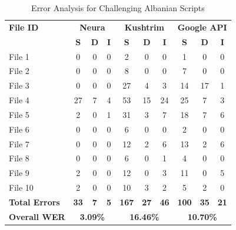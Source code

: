 \documentclass[12pt]{article}
\begin{document}
\begin{table}[h!]
\centering
\caption{Error Analysis for Challenging Albanian Scripts}
\label{tab:firs_test}
\begin{tabular}{lccc|ccc|ccc}
\toprule
\textbf{File ID} & \multicolumn{3}{c}{\textbf{Neura}} & \multicolumn{3}{c}{\textbf{Kushtrim}} & \multicolumn{3}{c}{\textbf{Google API}} \\
\cmidrule(lr){2-4} \cmidrule(lr){5-7} \cmidrule(lr){8-10}
 & \textbf{S} & \textbf{D} & \textbf{I} & \textbf{S} & \textbf{D} & \textbf{I} & \textbf{S} & \textbf{D} & \textbf{I} \\
\midrule
File 1 & 0 & 0 & 0 & 2 & 0 & 0 & 1 & 0 & 0 \\
File 2 & 0 & 0 & 0 & 8 & 0 & 0 & 7 & 0 & 0 \\
File 3 & 0 & 0 & 0 & 27 & 4 & 3 & 14 & 17 & 1 \\
File 4 & 27 & 7 & 4 & 53 & 15 & 24 & 25 & 7 & 3 \\
File 5 & 2 & 0 & 1 & 31 & 3 & 7 & 18 & 7 & 6 \\
File 6 & 0 & 0 & 0 & 6 & 0 & 0 & 2 & 0 & 0 \\
File 7 & 0 & 0 & 0 & 12 & 2 & 6 & 13 & 2 & 6 \\
File 8 & 0 & 0 & 0 & 6 & 0 & 1 & 4 & 0 & 0 \\
File 9 & 2 & 0 & 0 & 12 & 0 & 3 & 11 & 0 & 5 \\
File 10 & 2 & 0 & 0 & 10 & 3 & 2 & 5 & 2 & 0 \\
\midrule
\textbf{Total Errors} & \textbf{33} & \textbf{7} & \textbf{5} & \textbf{167} & \textbf{27} & \textbf{46} & \textbf{100} & \textbf{35} & \textbf{21} \\
\textbf{Overall WER} & \multicolumn{3}{c}{\textbf{3.09\%}} & \multicolumn{3}{c}{\textbf{16.46\%}} & \multicolumn{3}{c}{\textbf{10.70\%}} \\
\bottomrule
\end{tabular}
\end{table}
\end{document}
